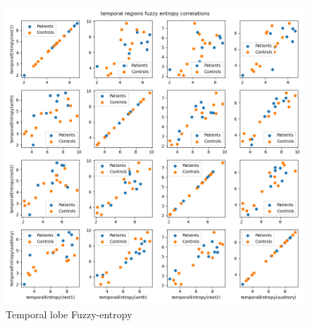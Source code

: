 \documentclass[10pt]{article}
\begin{document}
\begin{figure}[H]
  \includegraphics[width=16cm]{../../../data_analysis_results/FuzzEnt/temporal_region_corr.png}
  \caption{Temporal lobe Fuzzy-entropy}\label{temporal_fuzz}
\end{figure}
\end{document}
